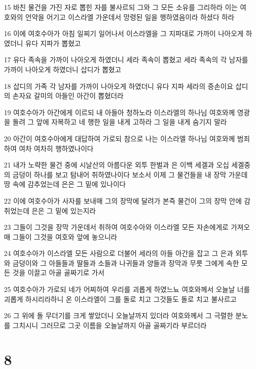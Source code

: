 \par 15 바친 물건을 가진 자로 뽑힌 자를 불사르되 그와 그 모든 소유를 그리하라 이는 여호와의 언약을 어기고 이스라엘 가운데서 망령된 일을 행하였음이라 하셨다 하라
\par 16 이에 여호수아가 아침 일찌기 일어나서 이스라엘을 그 지파대로 가까이 나아오게 하였더니 유다 지파가 뽑혔고
\par 17 유다 족속을 가까이 나아오게 하였더니 세라 족속이 뽑혔고 세라 족속의 각 남자를 가까이 나아오게 하였더니 삽디가 뽑혔고
\par 18 삽디의 가족 각 남자를 가까이 나아오게 하였더니 유다 지파 세라의 증손이요 삽디의 손자요 갈미의 아들인 아간이 뽑혔더라
\par 19 여호수아가 아간에게 이르되 내 아들아 청하노라 이스라엘의 하나님 여호와께 영광을 돌려 그 앞에 자복하고 네 행한 일을 내게 고하라 그 일을 내게 숨기지 말라
\par 20 아간이 여호수아에게 대답하여 가로되 참으로 나는 이스라엘 하나님 여호와께 범죄하여 여차 여차히 행하였나이다
\par 21 내가 노략한 물건 중에 시날산의 아름다운 외투 한벌과 은 이백 세겔과 오십 세겔중의 금덩이 하나를 보고 탐내어 취하였나이다 보소서 이제 그 물건들을 내 장막 가운데 땅 속에 감추었는데 은은 그 밑에 있나이다
\par 22 이에 여호수아가 사자를 보내매 그의 장막에 달려가 본즉 물건이 그의 장막 안에 감취었는데 은은 그 밑에 있는지라
\par 23 그들이 그것을 장막 가운데서 취하여 여호수아와 이스라엘 모든 자손에게로 가져오매 그들이 그것을 여호와 앞에 놓으니라
\par 24 여호수아가 이스라엘 모든 사람으로 더불어 세라의 아들 아간을 잡고 그 은과 외투와 금덩이와 그 아들들과 딸들과 소들과 나귀들과 양들과 장막과 무릇 그에게 속한 모든 것을 이끌고 아골 골짜기로 가서
\par 25 여호수아가 가로되 네가 어찌하여 우리를 괴롭게 하였느뇨 여호와께서 오늘날 너를 괴롭게 하시리라하니 온 이스라엘이 그를 돌로 치고 그것들도 돌로 치고 불사르고
\par 26 그 위에 돌 무더기를 크게 쌓았더니 오늘날까지 있더라 여호와께서 그 극렬한 분노를 그치시니 그러므로 그곳 이름을 오늘날까지 아골 골짜기라 부르더라

\chapter{8}

